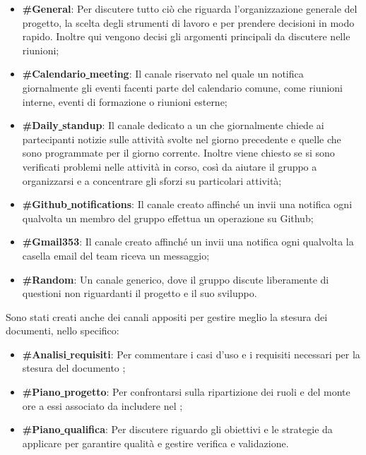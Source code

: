 \documentclass[NormeDiProgetto.tex]{subfiles}
\begin{document}
	\begin{itemize}
		\item \textbf{\#General}: Per discutere tutto ciò che riguarda l'organizzazione generale del progetto, la scelta degli strumenti di lavoro e per prendere decisioni in modo rapido. Inoltre qui vengono decisi gli argomenti principali da discutere nelle riunioni;
		\item \textbf{\#Calendario\underline{ }meeting}: Il canale riservato nel quale un  notifica giornalmente gli eventi facenti parte del calendario comune, come riunioni interne, eventi di formazione o riunioni esterne;
		\item \textbf{\#Daily\underline{ }standup}: Il canale dedicato a un  che giornalmente chiede ai partecipanti notizie sulle attività svolte nel giorno precedente e quelle che sono programmate per il giorno corrente. Inoltre viene chiesto se si sono verificati problemi nelle attività in corso, così da aiutare il gruppo a organizzarsi e a concentrare gli sforzi su particolari attività;
		\item \textbf{\#Github\underline{ }notifications}: Il canale creato affinché un  invii una notifica ogni qualvolta un membro del gruppo effettua un operazione su Github;
		\item \textbf{\#Gmail353}: Il canale creato affinché un  invii una notifica ogni qualvolta la casella email del team riceva un messaggio;
		\item \textbf{\#Random}: Un canale generico, dove il gruppo discute liberamente di questioni non riguardanti il progetto e il suo sviluppo.	
	\end{itemize}

	Sono stati creati anche dei canali appositi per gestire meglio la stesura dei documenti, nello specifico:
	\begin{itemize}
		\item \textbf{\#Analisi\underline{ }requisiti}: Per commentare i casi d'uso e i requisiti necessari per la stesura del documento \adr;
		\item \textbf{\#Piano\underline{ }progetto}: Per confrontarsi sulla ripartizione dei ruoli e del monte ore a essi associato da includere nel \pdp;
		\item \textbf{\#Piano\underline{ }qualifica}: Per discutere riguardo gli obiettivi e le strategie da applicare per garantire qualità e gestire verifica e validazione.
	\end{itemize}
	
\end{document}
